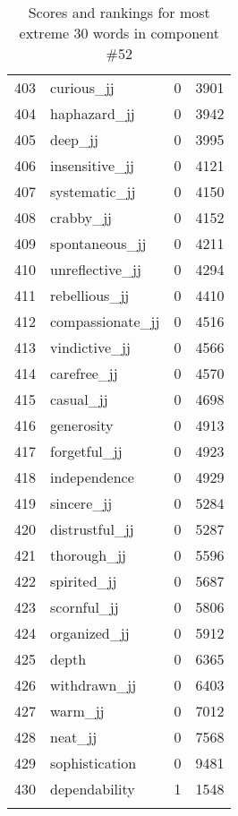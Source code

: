 \begin{longtable}[!htbp]{| rlr@{.}l |}
    403 & curious\_jj & 0 & 3901 \\
    404 & haphazard\_jj & 0 & 3942 \\
    405 & deep\_jj & 0 & 3995 \\
    406 & insensitive\_jj & 0 & 4121 \\
    407 & systematic\_jj & 0 & 4150 \\
    408 & crabby\_jj & 0 & 4152 \\
    409 & spontaneous\_jj & 0 & 4211 \\
    410 & unreflective\_jj & 0 & 4294 \\
    411 & rebellious\_jj & 0 & 4410 \\
    412 & compassionate\_jj & 0 & 4516 \\
    413 & vindictive\_jj & 0 & 4566 \\
    414 & carefree\_jj & 0 & 4570 \\
    415 & casual\_jj & 0 & 4698 \\
    416 & generosity & 0 & 4913 \\
    417 & forgetful\_jj & 0 & 4923 \\
    418 & independence & 0 & 4929 \\
    419 & sincere\_jj & 0 & 5284 \\
    420 & distrustful\_jj & 0 & 5287 \\
    421 & thorough\_jj & 0 & 5596 \\
    422 & spirited\_jj & 0 & 5687 \\
    423 & scornful\_jj & 0 & 5806 \\
    424 & organized\_jj & 0 & 5912 \\
    425 & depth & 0 & 6365 \\
    426 & withdrawn\_jj & 0 & 6403 \\
    427 & warm\_jj & 0 & 7012 \\
    428 & neat\_jj & 0 & 7568 \\
    429 & sophistication & 0 & 9481 \\
    430 & dependability & 1 & 1548 \\
    \hline
    \caption{Scores and rankings for most extreme 30 words in component \#52} \\
\end{longtable}
